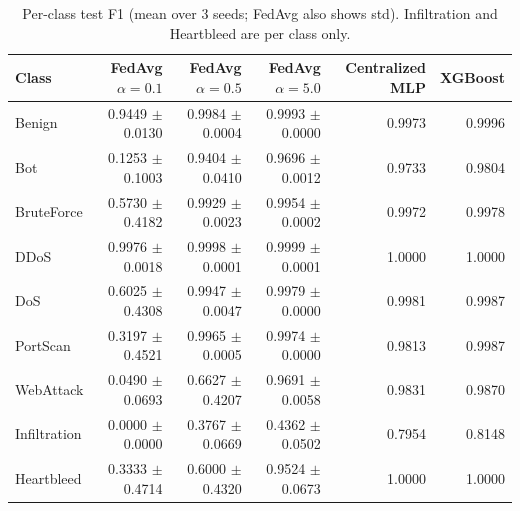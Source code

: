\begin{table}[t]
\centering
\caption{Per-class test F1 (mean over 3 seeds; FedAvg also shows std). Infiltration and Heartbleed are per class only.} %
\label{tab:perclass}
\footnotesize
\begin{tabular}{@{}lrrrrr@{}}
\toprule
Class & FedAvg $\alpha=0.1$ & FedAvg $\alpha=0.5$ & FedAvg $\alpha=5.0$ & Centralized MLP & XGBoost\\ %
\midrule
Benign & 0.9449 $\pm$ 0.0130 & 0.9984 $\pm$ 0.0004 & 0.9993 $\pm$ 0.0000 & 0.9973 & 0.9996\\ %
Bot & 0.1253 $\pm$ 0.1003 & 0.9404 $\pm$ 0.0410 & 0.9696 $\pm$ 0.0012 & 0.9733 & 0.9804\\ %
BruteForce & 0.5730 $\pm$ 0.4182 & 0.9929 $\pm$ 0.0023 & 0.9954 $\pm$ 0.0002 & 0.9972 & 0.9978\\ %
DDoS & 0.9976 $\pm$ 0.0018 & 0.9998 $\pm$ 0.0001 & 0.9999 $\pm$ 0.0001 & 1.0000 & 1.0000\\ %
DoS & 0.6025 $\pm$ 0.4308 & 0.9947 $\pm$ 0.0047 & 0.9979 $\pm$ 0.0000 & 0.9981 & 0.9987\\ %
PortScan & 0.3197 $\pm$ 0.4521 & 0.9965 $\pm$ 0.0005 & 0.9974 $\pm$ 0.0000 & 0.9813 & 0.9987\\ %
WebAttack & 0.0490 $\pm$ 0.0693 & 0.6627 $\pm$ 0.4207 & 0.9691 $\pm$ 0.0058 & 0.9831 & 0.9870\\ %
Infiltration & 0.0000 $\pm$ 0.0000 & 0.3767 $\pm$ 0.0669 & 0.4362 $\pm$ 0.0502 & 0.7954 & 0.8148\\ %
Heartbleed & 0.3333 $\pm$ 0.4714 & 0.6000 $\pm$ 0.4320 & 0.9524 $\pm$ 0.0673 & 1.0000 & 1.0000\\ %
\bottomrule
\end{tabular}
\end{table}

